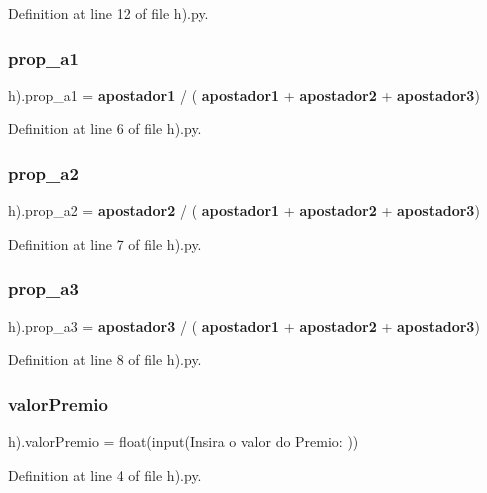 Definition at line 12 of file h).\+py.

\mbox{\label{namespaceh_08_a134ce6211d15516f5abdad887f967aa8}} 
\subsubsection{prop\_a1}
{\footnotesize\ttfamily h).prop\+\_\+a1 = \textbf{ apostador1} / (\textbf{ apostador1} + \textbf{ apostador2} + \textbf{ apostador3})}



Definition at line 6 of file h).\+py.

\mbox{\label{namespaceh_08_a0a3f48c675aa77e317df2f70167e4bb4}} 
\subsubsection{prop\_a2}
{\footnotesize\ttfamily h).prop\+\_\+a2 = \textbf{ apostador2} / (\textbf{ apostador1} + \textbf{ apostador2} + \textbf{ apostador3})}



Definition at line 7 of file h).\+py.

\mbox{\label{namespaceh_08_a9002e791b0933bb6f658e3e42b9efeec}} 
\subsubsection{prop\_a3}
{\footnotesize\ttfamily h).prop\+\_\+a3 = \textbf{ apostador3} / (\textbf{ apostador1} + \textbf{ apostador2} + \textbf{ apostador3})}



Definition at line 8 of file h).\+py.

\mbox{\label{namespaceh_08_a59396d225466b3d5dcfb7a966e3a5f3b}} 
\subsubsection{valorPremio}
{\footnotesize\ttfamily h).valor\+Premio = float(input(\textquotesingle{}Insira o valor do Premio\+: \textquotesingle{}))}



Definition at line 4 of file h).\+py.

